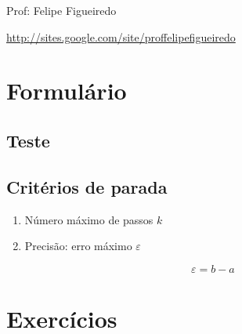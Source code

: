 \documentclass[a4paper]{article}
\begin{document}
\parbox[c]{.825\textwidth}{\raggedright%
{Prof: Felipe Figueiredo\par}
{\url{http://sites.google.com/site/proffelipefigueiredo}}

\vspace{1cm}
}


\section{Formulário}

\subsection*{Teste}

\begin{center}
\end{center}

\subsection*{Critérios de parada}

\begin{enumerate}
\item Número máximo de passos $k$

\item Precisão: erro máximo $\varepsilon$

\begin{displaymath}
  \varepsilon = b - a
\end{displaymath}

\end{enumerate}

\section{Exercícios}
\end{document}
